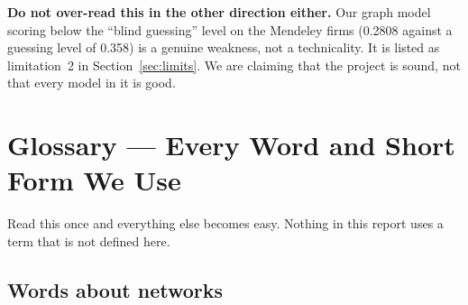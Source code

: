 \documentclass[11pt,a4paper]{article}
\begin{document}
\begin{warnbox}
\textbf{Do not over-read this in the other direction either.} Our graph model
scoring below the ``blind guessing'' level on the Mendeley firms (0.2808 against
a guessing level of 0.358) is a genuine weakness, not a technicality. It is
listed as limitation~2 in Section~\ref{sec:limits}. We are claiming that the
project is sound, not that every model in it is good.
\end{warnbox}

\section{Glossary --- Every Word and Short Form We Use}
\label{sec:glossary}

Read this once and everything else becomes easy. Nothing in this report uses a
term that is not defined here.

\subsection{Words about networks}
\end{document}
